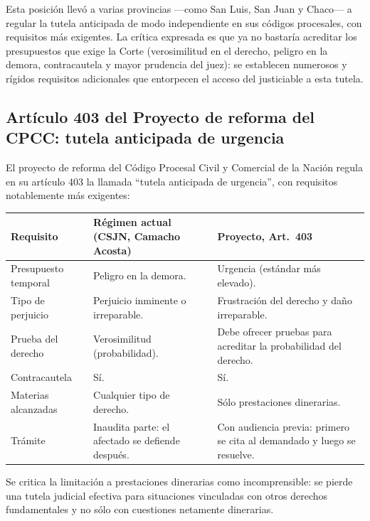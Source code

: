 \documentclass[12pt,oneside]{book}
\renewcommand{\arraystretch}{1.15}
\begin{document}
Esta posición llevó a varias provincias ---como San Luis, San Juan y Chaco--- a regular la tutela anticipada de modo independiente en sus códigos procesales, con requisitos más exigentes. La crítica expresada es que ya no bastaría acreditar los presupuestos que exige la Corte (verosimilitud en el derecho, peligro en la demora, contracautela y mayor prudencia del juez): se establecen numerosos y rígidos requisitos adicionales que entorpecen el acceso del justiciable a esta tutela.

\subsection{Artículo 403 del Proyecto de reforma del CPCC: tutela anticipada de urgencia}

El proyecto de reforma del Código Procesal Civil y Comercial de la Nación regula en su artículo 403 la llamada ``tutela anticipada de urgencia'', con requisitos notablemente más exigentes:

\medskip
\renewcommand{\arraystretch}{1.3}
\noindent\begin{tabularx}{\textwidth}{@{}>{\raggedright\arraybackslash}p{2.8cm} Y Y@{}}
\toprule
\textbf{Requisito} & \textbf{Régimen actual (CSJN, Camacho Acosta)} & \textbf{Proyecto, Art.~403} \\
\midrule
Presupuesto temporal &
Peligro en la demora. &
Urgencia (estándar más elevado). \\
\addlinespace
Tipo de perjuicio &
Perjuicio inminente o irreparable. &
Frustración del derecho y daño irreparable. \\
\addlinespace
Prueba del derecho &
Verosimilitud (probabilidad). &
Debe ofrecer pruebas para acreditar la probabilidad del derecho. \\
\addlinespace
Contracautela &
Sí. &
Sí. \\
\addlinespace
Materias alcanzadas &
Cualquier tipo de derecho. &
Sólo prestaciones dinerarias. \\
\addlinespace
Trámite &
Inaudita parte: el afectado se defiende después. &
Con audiencia previa: primero se cita al demandado y luego se resuelve. \\
\bottomrule
\end{tabularx}
\renewcommand{\arraystretch}{1}

\medskip
Se critica la limitación a prestaciones dinerarias como incomprensible: se pierde una tutela judicial efectiva para situaciones vinculadas con otros derechos fundamentales y no sólo con cuestiones netamente dinerarias.
\end{document}
